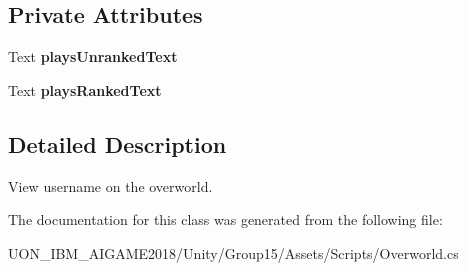 \subsection*{Private Attributes}
\begin{DoxyCompactItemize}
\item 
\mbox{\label{class_overworld_acc8ed451f9c538a45f30306c09ce25e4}} 
Text {\bfseries plays\+Unranked\+Text}
\item 
\mbox{\label{class_overworld_ac71b777e9c447e4a637bcc6a2b30499a}} 
Text {\bfseries plays\+Ranked\+Text}
\end{DoxyCompactItemize}


\subsection{Detailed Description}
View username on the overworld. 

The documentation for this class was generated from the following file\+:\begin{DoxyCompactItemize}
\item 
U\+O\+N\+\_\+\+I\+B\+M\+\_\+\+A\+I\+G\+A\+M\+E2018/\+Unity/\+Group15/\+Assets/\+Scripts/Overworld.\+cs\end{DoxyCompactItemize}

